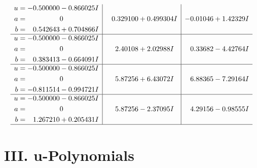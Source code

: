 \documentclass[1p]{elsarticle_modified}
\theoremstyle{definition}
\begin{document}
$$\begin{array}{c|c|c}
\begin{aligned}
u &= -0.500000 - 0.866025 I \\
a &= \phantom{-0.000000 } 0 \\
b &= \phantom{-}0.542643 + 0.704866 I\end{aligned}
 & \phantom{-}0.329100 + 0.499304 I & -0.01046 + 1.42329 I \\ \hline\begin{aligned}
u &= -0.500000 - 0.866025 I \\
a &= \phantom{-0.000000 } 0 \\
b &= \phantom{-}0.383413 - 0.664091 I\end{aligned}
 & \phantom{-}2.40108 + 2.02988 I & \phantom{-}0.33682 - 4.42764 I \\ \hline\begin{aligned}
u &= -0.500000 - 0.866025 I \\
a &= \phantom{-0.000000 } 0 \\
b &= -0.811514 - 0.994721 I\end{aligned}
 & \phantom{-}5.87256 + 6.43072 I & \phantom{-}6.88365 - 7.29164 I \\ \hline\begin{aligned}
u &= -0.500000 - 0.866025 I \\
a &= \phantom{-0.000000 } 0 \\
b &= \phantom{-}1.267210 + 0.205431 I\end{aligned}
 & \phantom{-}5.87256 - 2.37095 I & \phantom{-}4.29156 - 0.98555 I\\
 \hline 
 \end{array}$$\newpage
\newpage\renewcommand{\arraystretch}{1}
\centering \section*{ III. u-Polynomials}
\end{document}
